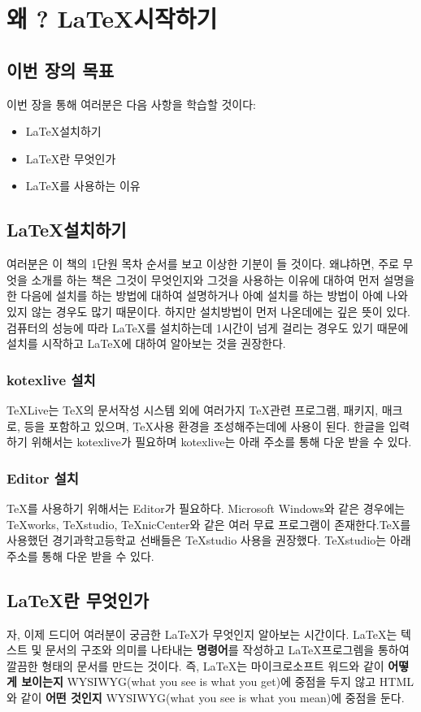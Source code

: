 \documentclass[12pt]{article}
\begin{document}
	\section{왜 ? \LaTeX 시작하기}
	\subsection{이번 장의 목표}
	이번 장을 통해 여러분은 다음 사항을 학습할 것이다:
	\begin{itemize}
		\item \LaTeX 설치하기
		\item \LaTeX 란 무엇인가
		\item \LaTeX 를 사용하는 이유
	\end{itemize}
	
	\subsection{\LaTeX 설치하기}
	여러분은 이 책의 1단원 목차 순서를 보고 이상한 기분이 들 것이다. 왜냐하면, 주로 무엇을 소개를 하는 책은 그것이 무엇인지와 그것을 사용하는 이유에 대하여 먼저 설명을 한 다음에 설치를 하는 방법에 대하여 설명하거나 아예 설치를 하는 방법이 아예 나와있지 않는 경우도 많기 때문이다. 하지만 설치방법이 먼저 나온데에는 깊은 뜻이 있다. 검퓨터의 성능에 따라 \LaTeX 를 설치하는데 1시간이 넘게 걸리는 경우도 있기 때문에 설치를 시작하고 \LaTeX 에 대하여 알아보는 것을 권장한다.
	\subsubsection{kotexlive 설치}
	\TeX Live는 \TeX 의 문서작성 시스템 외에 여러가지 \TeX 관련 프로그램, 패키지, 매크로, 등을 포함하고 있으며, \TeX 사용 환경을 조성해주는데에 사용이 된다. 한글을 입력하기 위해서는 kotexlive가 필요하며 kotexlive는 아래 주소를 통해 다운 받을 수 있다.
	\subsubsection{Editor 설치}
	\TeX 를 사용하기 위해서는 Editor가 필요하다. Microsoft Windows와 같은 경우에는 TeXworks, TeXstudio, TeXnicCenter와 같은 여러 무료 프로그램이 존재한다.\TeX 를 사용했던 경기과학고등학교 선배들은 TeXstudio 사용을 권장했다. TeXstudio는 아래 주소를 통해 다운 받을 수 있다.
	\subsection{\LaTeX 란 무엇인가}
	자, 이제 드디어 여러분이 궁금한 \LaTeX 가 무엇인지 알아보는 시간이다. \LaTeX 는 텍스트 및 문서의 구조와 의미를 나타내는 {\bf 명령어}를 작성하고 \LaTeX 프로그렘을 통하여 깔끔한 형태의 문서를 만드는 것이다. 즉, \LaTeX 는 마이크로소프트 워드와 같이 {\bf 어떻게 보이는지} WYSIWYG(what you see is what you get)에 중점을 두지 않고 HTML와 같이 {\bf 어떤 것인지} WYSIWYG(what you see is what you mean)에 중점을 둔다.
\end{document}
